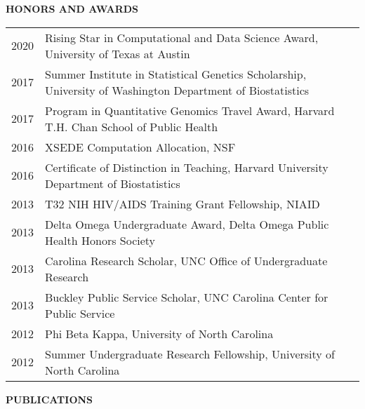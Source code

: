 \documentclass[10pt]{article}
\begin{document}
{ \bf HONORS AND AWARDS} \hrulefill \\
 \setlength\intextsep{0mm}
\begin{center}
	\begin{table}[H]
		\centering
		\begin{tabular}{@{}p{1.3cm}@{}@{}p{16.2cm}@{}}
			2020 & Rising Star in Computational and Data Science Award, University of Texas at Austin \\
			2017  & Summer Institute in Statistical Genetics Scholarship, University of Washington Department of Biostatistics  \\ 
			2017  & Program in Quantitative Genomics Travel Award, Harvard T.H. Chan School of Public Health  \\ 
			2016  & XSEDE Computation Allocation, NSF            \\ 
			2016  & Certificate of Distinction in Teaching, Harvard University Department of Biostatistics             \\ 
			2013 & T32 NIH HIV/AIDS Training Grant Fellowship, NIAID \\
			2013  & Delta Omega Undergraduate Award, Delta Omega Public Health Honors Society       \\ 
			2013  & Carolina Research Scholar, UNC Office of Undergraduate Research   \\ 
			2013  & Buckley Public Service Scholar, UNC Carolina Center for Public Service    \\ 
			2012  &Phi Beta Kappa, University of North Carolina \\
			2012  & Summer Undergraduate Research Fellowship, University of North Carolina  
		\end{tabular}
	\end{table}
\end{center}

\pagebreak

{ \bf PUBLICATIONS} \hrulefill \\
\end{document}
